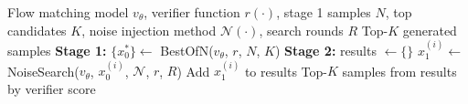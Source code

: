 \documentclass{article} %
\begin{document}
\begin{algorithm}[H]
\caption{Two-Stage RS + Noise Search}
\label{alg:best-of-n-noise-search}
\begin{algorithmic}[1]
\Require Flow matching model $v_\theta$, verifier function $r(\cdot)$, stage 1 samples $N$, top candidates $K$, noise injection method $\mathcal{N}(\cdot)$, search rounds $R$
\Ensure Top-$K$ generated samples
\State \textbf{Stage 1:} $\{x_0^*\} \leftarrow$ BestOfN($v_\theta$, $r$, $N$, $K$) 
\State \textbf{Stage 2:} results $\leftarrow \{\}$
    \State $x_1^{(i)} \leftarrow$ NoiseSearch($v_\theta$, $x_0^{(i)}$, $\mathcal{N}$, $r$, $R$) 
    \State Add $x_1^{(i)}$ to results
\EndFor
\State \Return Top-$K$ samples from results by verifier score
\end{algorithmic}
\end{algorithm}
\end{document}
